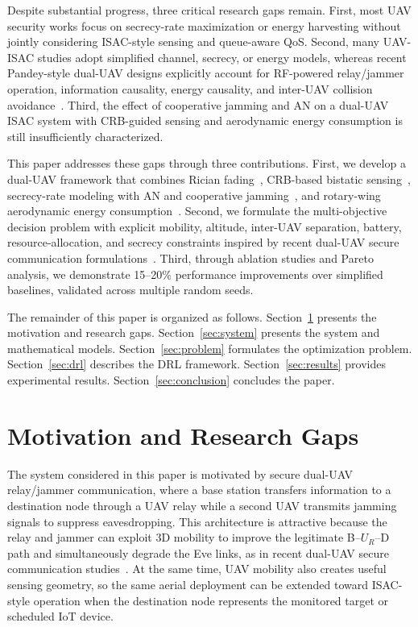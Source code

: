 \documentclass[journal]{IEEEtran}
\begin{document}
Despite substantial progress, three critical research gaps remain. First, most UAV security works focus on secrecy-rate maximization or energy harvesting without jointly considering ISAC-style sensing and queue-aware QoS. Second, many UAV-ISAC studies adopt simplified channel, secrecy, or energy models, whereas recent Pandey-style dual-UAV designs explicitly account for RF-powered relay/jammer operation, information causality, energy causality, and inter-UAV collision avoidance~\cite{pandeydualuav2026, pandeyrobust2025}. Third, the effect of cooperative jamming and AN on a dual-UAV ISAC system with CRB-guided sensing and aerodynamic energy consumption is still insufficiently characterized.

This paper addresses these gaps through three contributions. First, we develop a dual-UAV framework that combines Rician fading~\cite{khuwaja2018survey}, CRB-based bistatic sensing~\cite{zhang2023drlisac}, secrecy-rate modeling with AN and cooperative jamming~\cite{pandeyswiptjam2025, pandeydualuav2026}, and rotary-wing aerodynamic energy consumption~\cite{zeng2019energy, pandeyaoidrl2025}. Second, we formulate the multi-objective decision problem with explicit mobility, altitude, inter-UAV separation, battery, resource-allocation, and secrecy constraints inspired by recent dual-UAV secure communication formulations~\cite{wang2021robust3d, pandeydualuav2026}. Third, through ablation studies and Pareto analysis, we demonstrate 15--20\% performance improvements over simplified baselines, validated across multiple random seeds.

The remainder of this paper is organized as follows. Section~\ref{sec:motivation} presents the motivation and research gaps. Section~\ref{sec:system} presents the system and mathematical models. Section~\ref{sec:problem} formulates the optimization problem. Section~\ref{sec:drl} describes the DRL framework. Section~\ref{sec:results} provides experimental results. Section~\ref{sec:conclusion} concludes the paper.

\section{Motivation and Research Gaps}
\label{sec:motivation}

The system considered in this paper is motivated by secure dual-UAV relay/jammer communication, where a base station transfers information to a destination node through a UAV relay while a second UAV transmits jamming signals to suppress eavesdropping. This architecture is attractive because the relay and jammer can exploit 3D mobility to improve the legitimate B--$U_R$--D path and simultaneously degrade the Eve links, as in recent dual-UAV secure communication studies~\cite{wang2021robust3d, pandeydualuav2026}. At the same time, UAV mobility also creates useful sensing geometry, so the same aerial deployment can be extended toward ISAC-style operation when the destination node represents the monitored target or scheduled IoT device.
\end{document}
